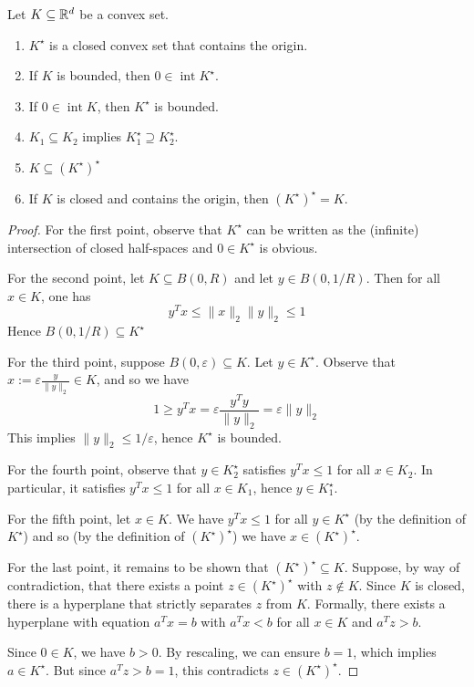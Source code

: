 \begin{lemma}
  Let $K \subseteq \mathbb{R}^d$ be a convex set.
  \begin{enumerate}
    \item $K^\star$ is a closed convex set that contains the origin.
    \item If $K$ is bounded, then $0 \in \operatorname{int} K^\star$.
    \item If $0 \in \operatorname{int} K$, then $K^\star$ is bounded.
    \item $K_1 \subseteq K_2$ implies $K_1^\star \supseteq K_2^\star$.
    \item $K \subseteq (K^\star)^\star$
    \item If $K$ is closed and contains the origin, then $(K^\star)^\star = K$.
  \end{enumerate}
\end{lemma}
\begin{proof}
  For the first point, observe that $K^\star$ can be written as the (infinite) intersection
  of closed half-spaces and $0 \in K^\star$ is obvious.

  For the second point, let $K \subseteq B(0, R)$
  and let $y \in B(0, 1/R)$.
  Then for all $x \in K$, one has
  \[
    y^T x \leq \|x\|_2 \|y\|_2 \leq 1
  \]
  Hence $B(0,1/R) \subseteq K^\star$

  For the third point, suppose $B(0,\varepsilon) \subseteq K$.
  Let $y \in K^\star$.
  Observe that $x := \varepsilon \frac{y}{\|y\|_2} \in K$,
  and so we have
  \[
    1 \geq y^Tx = \varepsilon \frac{y^Ty}{\|y\|_2} = \varepsilon \|y\|_2
  \]
  This implies $\|y\|_2 \leq 1/\varepsilon$, hence $K^\star$ is bounded.

  For the fourth point, observe that $y \in K_2^\star$
  satisfies $y^Tx \leq 1$ for all $x \in K_2$.
  In particular, it satisfies $y^Tx \leq 1$ for all $x \in K_1$,
  hence $y \in K_1^\star$.

  For the fifth point,
  let $x \in K$.
  We have $y^Tx \leq 1$ for all $y \in K^\star$ (by the definition of $K^\star$)
  and so (by the definition of $(K^\star)^\star$) we have $x \in (K^\star)^\star$.

  For the last point,
  it remains to be shown that $(K^\star)^\star \subseteq K$.
  Suppose, by way of contradiction,
  that there exists a point $z \in (K^\star)^\star$ with $z \not\in K$.
  Since $K$ is closed,
  there is a hyperplane that strictly separates $z$ from $K$.
  Formally, there exists a hyperplane with equation $a^Tx = b$
  with $a^Tx < b$ for all $x \in K$ and $a^Tz > b$.

  Since $0 \in K$, we have $b > 0$.
  By rescaling, we can ensure $b = 1$, which implies $a \in K^\star$.
  But since $a^Tz > b = 1$, this contradicts $z \in (K^\star)^\star$.
\end{proof}

